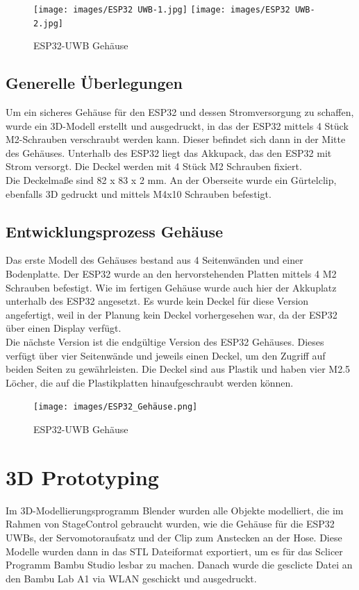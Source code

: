 \begin{figure}[H]
	\centering
	\texttt{[image: images/ESP32 UWB-1.jpg]}
	\texttt{[image: images/ESP32 UWB-2.jpg]}
	\caption[ESP32-UWB Gehäuse]{ESP32-UWB Gehäuse}
	\label{fig:ESP32-UWB Gehäuse V2}
\end{figure}

\subsection{Generelle Überlegungen}
Um ein sicheres Gehäuse für den ESP32 und dessen Stromversorgung zu schaffen, wurde ein 3D-Modell erstellt und ausgedruckt, in das der ESP32 mittels 4 Stück M2-Schrauben verschraubt werden kann. Dieser befindet sich dann in der Mitte des Gehäuses. Unterhalb des ESP32 liegt das Akkupack, das den ESP32 mit Strom versorgt.
Die Deckel werden mit 4 Stück M2 Schrauben fixiert. \\
Die Deckelmaße sind 82 x 83 x 2 mm. An der Oberseite wurde ein Gürtelclip, ebenfalls 3D gedruckt und mittels M4x10 Schrauben befestigt.

\newpage
\subsection{Entwicklungsprozess Gehäuse}
Das erste Modell des Gehäuses bestand aus 4 Seitenwänden und einer Bodenplatte. Der ESP32 wurde an den hervorstehenden Platten mittels 4 M2 Schrauben befestigt. Wie im fertigen Gehäuse wurde auch hier der Akkuplatz unterhalb des ESP32 angesetzt. Es wurde kein Deckel für diese Version angefertigt, weil in der Planung kein Deckel vorhergesehen war, da der ESP32 über einen Display verfügt. \\
Die nächste Version ist die endgültige Version des ESP32 Gehäuses. Dieses verfügt über vier Seitenwände und jeweils einen Deckel, um den Zugriff auf beiden Seiten zu gewährleisten. Die Deckel sind aus Plastik und haben vier M2.5 Löcher, die auf die Plastikplatten hinaufgeschraubt werden können.

\begin{figure}[H]
	\centering
	\texttt{[image: images/ESP32\_Gehäuse.png]}
	\caption[ESP32-UWB Gehäuse]{ESP32-UWB Gehäuse}
	\label{fig:ESP32-UWB Gehäuse}
\end{figure}


\section{3D Prototyping}
Im 3D-Modellierungsprogramm Blender wurden alle Objekte modelliert, die im Rahmen von StageControl gebraucht wurden, wie die Gehäuse für die ESP32 UWBs, der Servomotoraufsatz und der Clip zum Anstecken an der Hose. Diese Modelle wurden dann in das STL Dateiformat exportiert, um es für das Sclicer Programm Bambu Studio lesbar zu machen. Danach wurde die gesclicte Datei an den Bambu Lab A1 via WLAN geschickt und ausgedruckt.

